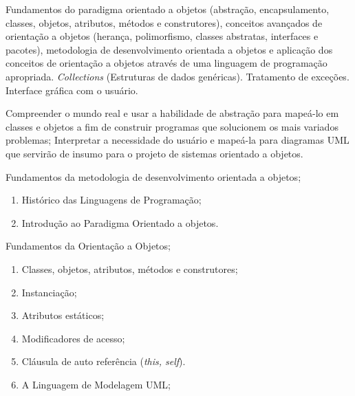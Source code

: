 

\begin{pud}
	
	

	\ementa
	Fundamentos do paradigma orientado a objetos (abstração, encapsulamento, classes, objetos, atributos, métodos e construtores), conceitos avançados de orientação a objetos (herança, polimorfismo, classes abstratas, interfaces e pacotes), metodologia de desenvolvimento orientada a objetos e aplicação dos conceitos de orientação a objetos através de uma linguagem de programação apropriada. \textit{Collections} (Estruturas de dados genéricas). Tratamento de exceções. Interface gráfica com o usuário.
	
	\objetivos
	Compreender o mundo real e usar a habilidade de abstração para mapeá-lo em classes e objetos a fim de construir programas que solucionem os mais variados problemas; Interpretar a necessidade do usuário e mapeá-la para diagramas UML que servirão de insumo para o projeto de sistemas orientado a objetos.
	
	\programa
	\begin{description}[itemsep=0em]
		\item[UNIDADE I:] Fundamentos da metodologia de desenvolvimento orientada a objetos; 
	         \begin{enumerate}[itemsep=0em, topsep=0em]
                \item Histórico das Linguagens de Programação;
                \item Introdução ao Paradigma Orientado a objetos.
            \end{enumerate}
            
        \item[UNIDADE II:] Fundamentos da Orientação a Objetos;
	         \begin{enumerate}[itemsep=0em, topsep=0em]
                \item Classes, objetos, atributos, métodos e construtores;
				\item Instanciação;
				\item Atributos estáticos;
				\item Modificadores de acesso;
				\item Cláusula de auto referência (\textit{this, self}).
				\item A Linguagem de Modelagem UML;
            \end{enumerate}
            

\end{description}
\end{pud}

